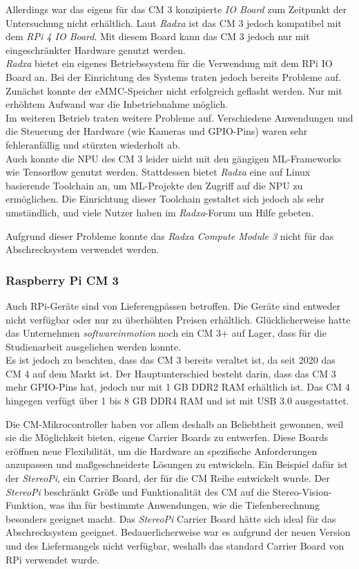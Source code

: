 Allerdings war das eigens für das \ac{CM} 3 konzipierte \textit{IO Board} zum Zeitpunkt der Untersuchung nicht erhältlich. Laut \textit{Radxa} ist das \ac{CM} 3 jedoch kompatibel mit dem \textit{\acl*{RPi} 4 IO Board}. Mit diesem Board kann das \ac{CM} 3 jedoch nur mit eingeschränkter Hardware genutzt werden.
\\
\textit{Radxa} bietet ein eigenes Betriebssystem für die Verwendung mit dem \ac{RPi} IO Board an. Bei der Einrichtung des Systems traten jedoch bereits Probleme auf. Zunächst konnte der \ac{eMMC}-Speicher nicht erfolgreich geflasht werden. Nur mit erhöhtem Aufwand war die Inbetriebnahme möglich.
\\
Im weiteren Betrieb traten weitere Probleme auf. Verschiedene Anwendungen und die Steuerung der Hardware (wie Kameras und \ac{GPIO}-Pins) waren sehr fehleranfällig und stürzten wiederholt ab.
\\
Auch konnte die \ac{NPU} des \ac{CM} 3 leider nicht mit den gängigen \ac{ML}-Frameworks wie Tensorflow genutzt werden. Stattdessen bietet \textit{Radxa} eine auf Linux basierende Toolchain an, um \ac{ML}-Projekte den Zugriff auf die \ac{NPU} zu ermöglichen. Die Einrichtung dieser Toolchain gestaltet sich jedoch als sehr umständlich, und viele Nutzer haben im \textit{Radxa}-Forum um Hilfe gebeten. \cite{radxa}

Aufgrund dieser Probleme konnte das \textit{Radxa Compute Module 3} nicht für das Abschrecksystem verwendet werden.

\subsubsection{Raspberry Pi \ac{CM} 3}

Auch \ac{RPi}-Geräte sind von Lieferengpässen betroffen. Die Geräte sind entweder nicht verfügbar oder nur zu überhöhten Preisen erhältlich. Glücklicherweise hatte das Unternehmen \textit{softwareinmotion} noch ein \ac{CM} 3+ auf Lager, dass für die Studienarbeit ausgeliehen werden konnte.
\\
Es ist jedoch zu beachten, dass das \ac{CM} 3 bereits veraltet ist, da seit 2020 das \ac{CM} 4 auf dem Markt ist. Der Hauptunterschied besteht darin, dass das \ac{CM} 3 mehr \ac{GPIO}-Pins hat, jedoch nur mit 1 GB DDR2 RAM erhältlich ist. Das \ac{CM} 4 hingegen verfügt über 1 bis 8 GB DDR4 RAM und ist mit USB 3.0 ausgestattet. \cite{cm4_cm3}

Die \ac{CM}-Mikrocontroller haben vor allem deshalb an Beliebtheit gewonnen, weil sie die Möglichkeit bieten, eigene Carrier Boards zu entwerfen. Diese Boards eröffnen neue Flexibilität, um die Hardware an spezifische Anforderungen anzupassen und maßgeschneiderte Lösungen zu entwickeln. Ein Beispiel dafür ist der \textit{StereoPi}, ein Carrier Board, der für die \ac{CM} Reihe entwickelt wurde. Der \textit{StereoPi} beschränkt Größe und Funktionalität des \acl{CM} auf die Stereo-Vision-Funktion, was ihn für bestimmte Anwendungen, wie die Tiefenberechnung besonders geeignet macht. Das \textit{StereoPi} Carrier Board hätte sich ideal für das Abschrecksystem geeignet. Bedauerlicherweise war es aufgrund der neuen Version und des Liefermangels nicht verfügbar, weshalb das standard Carrier Board von \acl{RPi} verwendet wurde. \cite{stereopi}

